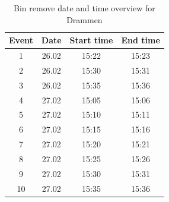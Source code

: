 \begin{table}[H]
\centering
\caption{Bin remove date and time overview for Drammen}
\label{tab:BR_dateandtimeDrammen}
\begin{tabular}{|c|c|c|c|}
\hline
\textbf{Event} & \textbf{Date} & \textbf{Start time} & \textbf{End time} \\ \hline
1              & 26.02         & 15:22               & 15:23             \\ \hline
2              & 26.02         & 15:30               & 15:31             \\ \hline
3              & 26.02         & 15:35               & 15:36             \\ \hline
4              & 27.02         & 15:05               & 15:06             \\ \hline
5              & 27.02         & 15:10               & 15:11             \\ \hline
6              & 27.02         & 15:15               & 15:16             \\ \hline
7              & 27.02         & 15:20               & 15:21             \\ \hline
8              & 27.02         & 15:25               & 15:26             \\ \hline
9              & 27.02         & 15:30               & 15:31             \\ \hline
10             & 27.02         & 15:35               & 15:36             \\ \hline
\end{tabular}
\end{table}

